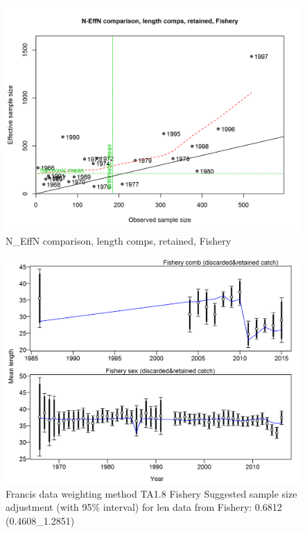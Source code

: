\documentclass[12pt,]{article}
\begin{document}
\begin{figure}
\centering
\includegraphics{./r4ss/plots_mod1/comp_lenfit_sampsize_flt1mkt2.png}
\caption{N\_EffN comparison, length comps, retained, Fishery
\label{fig:mod1_8_comp_lenfit_sampsize_flt1mkt2}}
\end{figure}

\begin{figure}
\centering
\includegraphics{./r4ss/plots_mod1/comp_lenfit_data_weighting_TA1.8_Fishery.png}
\caption{Francis data weighting method TA1.8 Fishery Suggested sample
size adjustment (with 95\% interval) for len data from Fishery: 0.6812
(0.4608\_1.2851)
\label{fig:mod1_9_comp_lenfit_data_weighting_TA1.8_Fishery}}
\end{figure}
\end{document}
